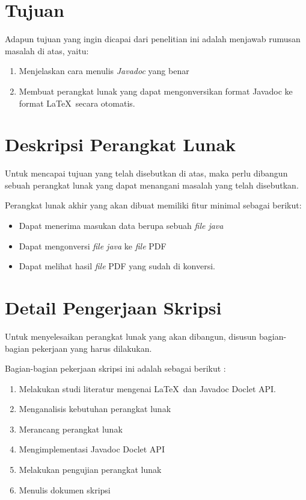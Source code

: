 \documentclass[a4paper,twoside]{article}
\begin{document}
\section{Tujuan}
Adapun tujuan yang ingin dicapai dari penelitian ini adalah menjawab rumusan masalah di atas, yaitu:
\begin{enumerate}
	\item Menjelaskan cara menulis {\it Javadoc} yang benar
	\item Membuat perangkat lunak yang dapat mengonversikan format Javadoc ke format \LaTeX\ secara otomatis.
\end{enumerate}

\section{Deskripsi Perangkat Lunak}
Untuk mencapai tujuan yang telah disebutkan di atas, maka perlu dibangun sebuah perangkat lunak yang dapat menangani masalah yang telah disebutkan.

Perangkat lunak akhir yang akan dibuat memiliki fitur minimal sebagai berikut:
\begin{itemize}
	\item Dapat menerima masukan data berupa sebuah {\it file java}
	\item Dapat mengonversi {\it file java} ke {\it file} PDF
	\item Dapat melihat hasil {\it file} PDF yang sudah di konversi.
\end{itemize}

\section{Detail Pengerjaan Skripsi}
Untuk menyelesaikan perangkat lunak yang akan dibangun, disusun bagian-bagian pekerjaan yang harus dilakukan.

Bagian-bagian pekerjaan skripsi ini adalah sebagai berikut :
	\begin{enumerate}
		\item Melakukan studi literatur mengenai \LaTeX\ dan Javadoc Doclet API.
		\item Menganalisis kebutuhan perangkat lunak
		\item Merancang perangkat lunak
		\item Mengimplementasi Javadoc Doclet API 
		\item Melakukan pengujian perangkat lunak
		\item Menulis dokumen skripsi
	\end{enumerate}
\end{document}
